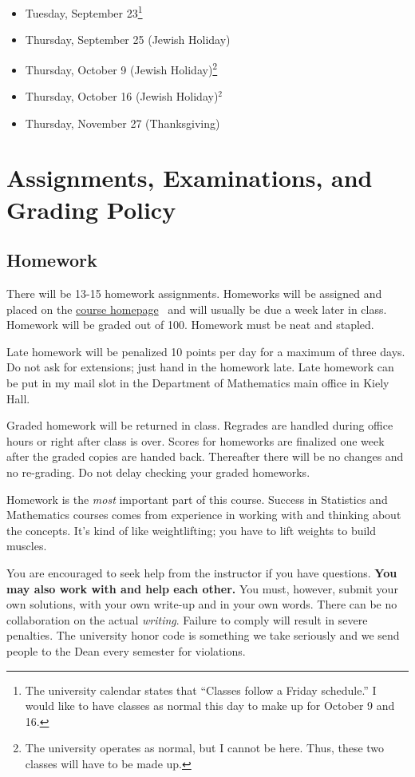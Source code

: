 \documentclass[12pt]{article}
\newcommand{\ingreen}[1]{\color{green}\textbf{#1} \color{black}}
\newcommand{\coursewebpage}{\href{https://github.com/kapelner/QC_Math_241_Fall_2014_15}{course homepage}}
\begin{document}
\begin{itemize}
\itemsep -0.0em 
\item Tuesday, September 23\footnote{The university calendar states that ``Classes follow a Friday schedule.'' I would like to have classes as normal this day to make up for October 9 and 16.}
\item Thursday, September 25 (Jewish Holiday)
\item Thursday, October 9 (Jewish Holiday)\footnote{The university operates as normal, but I cannot be here. Thus, these two classes will have to be made up.}
\item Thursday, October 16 (Jewish Holiday)$^2$
\item Thursday, November 27 (Thanksgiving)
\end{itemize}

\section*{Assignments, Examinations, and Grading Policy}

\subsection*{Homework}

There will be 13-15 homework assignments. Homeworks will be assigned and placed on the \coursewebpage~ and will usually be due a week later in class. Homework will be graded out of 100. Homework must be neat and stapled. 

Late homework will be penalized 10 points per day for a maximum of three days. Do not ask for extensions; just hand in the homework late. Late homework can be put in my mail slot in the Department of Mathematics main office in Kiely Hall.

Graded homework will be returned in class. Regrades are handled during office hours or right after class is over. Scores for homeworks are finalized one week after the graded copies are handed back. Thereafter there will be no changes and no re-grading. Do not delay checking your graded homeworks.

Homework is the \textit{most} important part of this course. Success in Statistics and Mathematics courses comes from experience in working with and thinking about the concepts. It's kind of like weightlifting; you have to lift weights to build muscles.

You are encouraged to seek help from the instructor if you have questions. \ingreen{You may also work with and help each other.} You must, however, submit your own solutions, with your own write-up and in your own words. There can be no collaboration on the actual \textit{writing}. Failure to comply will result in severe penalties. The university honor code is something we take seriously and we send people to the Dean every semester for violations.
\end{document}
